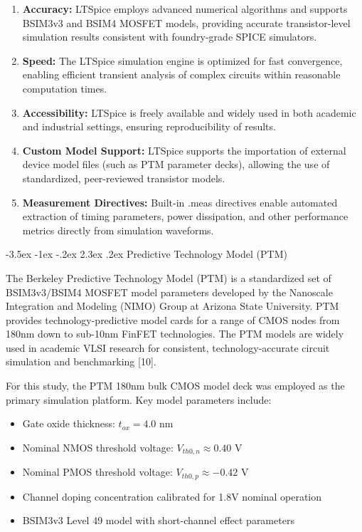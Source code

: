 \documentclass[12pt,a4paper,oneside]{report}
\makeatletter
\renewcommand\section{\@startsection {section}{1}{\z@}%
                                   {-3.5ex \@plus -1ex \@minus -.2ex}%
                                   {2.3ex \@plus.2ex}%
                                   {\normalfont\normalsize\bfseries}}
\makeatother
\begin{document}
\begin{enumerate}
\item \textbf{Accuracy:} LTSpice employs advanced numerical algorithms and supports BSIM3v3 and BSIM4 MOSFET models, providing accurate transistor-level simulation results consistent with foundry-grade SPICE simulators.
\item \textbf{Speed:} The LTSpice simulation engine is optimized for fast convergence, enabling efficient transient analysis of complex circuits within reasonable computation times.
\item \textbf{Accessibility:} LTSpice is freely available and widely used in both academic and industrial settings, ensuring reproducibility of results.
\item \textbf{Custom Model Support:} LTSpice supports the importation of external device model files (such as PTM parameter decks), allowing the use of standardized, peer-reviewed transistor models.
\item \textbf{Measurement Directives:} Built-in .meas directives enable automated extraction of timing parameters, power dissipation, and other performance metrics directly from simulation waveforms.
\end{enumerate}

\section{Predictive Technology Model (PTM)}

The Berkeley Predictive Technology Model (PTM) is a standardized set of BSIM3v3/BSIM4 MOSFET model parameters developed by the Nanoscale Integration and Modeling (NIMO) Group at Arizona State University. PTM provides technology-predictive model cards for a range of CMOS nodes from 180nm down to sub-10nm FinFET technologies. The PTM models are widely used in academic VLSI research for consistent, technology-accurate circuit simulation and benchmarking [10].

For this study, the PTM 180nm bulk CMOS model deck was employed as the primary simulation platform. Key model parameters include:
\begin{itemize}
\item Gate oxide thickness: $t_{ox} = 4.0\text{ nm}$
\item Nominal NMOS threshold voltage: $V_{th0,n} \approx 0.40\text{ V}$
\item Nominal PMOS threshold voltage: $V_{th0,p} \approx -0.42\text{ V}$
\item Channel doping concentration calibrated for 1.8V nominal operation
\item BSIM3v3 Level 49 model with short-channel effect parameters
\end{itemize}
\end{document}
